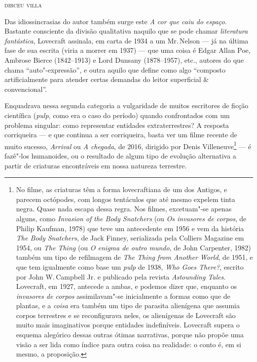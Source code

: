 \baselineskip


\begin{flushright}
\textsc{dirceu villa}
\end{flushright}

\noindent{}Das idiossincrasias do autor também surge este \textit{A cor que caiu do espaço}. Bastante consciente da divisão qualitativa naquilo que se pode chamar \textit{literatura fantástica}, Lovecraft assinala, em carta de 1934 a um Mr.\,Nelson --- já na última fase de sua escrita (viria a morrer em 1937) --- que uma coisa é Edgar Allan Poe, Ambrose Bierce (1842--1913) e Lord Dunsany (1878--1957), etc., autores do que chama ``auto"-expressão'', e outra aquilo que define como algo ``composto artificialmente para atender certas demandas do leitor superficial \& convencional''.

Enquadrava nessa segunda categoria a vulgaridade de muitos escritores de ficção
científica (\textit{pulp}, como era o caso do período) quando confrontados
com um problema singular: como representar entidades extraterrestres? A
resposta corriqueira --- e que continua a ser corriqueira, basta ver um
filme recente de muito sucesso, \textit{Arrival} ou \textit{A chegada}, de 2016,
dirigido por Denis Villeneuve\footnote{No filme, as criaturas têm a forma lovecraftiana de um dos Antigos, e parecem octópodes, com longos tentáculos que até mesmo expelem tinta negra. Quase nada escapa dessa regra. Nos filmes, excetuam"-se apenas alguns, como \textit{Invasion of the Body Snatchers} (ou \textit{Os invasores de corpos}, de Philip Kaufman, 1978) que teve um antecedente em 1956 e vem da história \textit{The Body Snatchers}, de Jack Finney, serializada pela Colliers Magazine em 1954, ou \textit{The Thing} (ou \textit{O enigma de outro mundo}, de John Carpenter, 1982) também um tipo de refilmagem de \textit{The Thing from Another World}, de 1951, e que tem igualmente como base um \textit{pulp} de 1938, \textit{Who Goes There?}, escrito por John W.\,Campbell Jr. e publicado pela revista \textit{Astounding Tales}. Lovecraft, em 1927, antecede a ambas, e podemos dizer que, enquanto os \textit{invasores de corpos} assimilavam"-se inicialmente a formas como que de plantas, e a \textit{coisa} era também um tipo de parasita alienígena que assumia corpos terrestres e se reconfigurava neles, os alienígenas de Lovecraft são muito mais imaginativos porque entidades indefiníveis. Lovecraft supera o esquema alegórico dessas outras ótimas narrativas, porque não propõe uma visão a ser lida como índice para outra coisa na realidade: o conto é, em si mesmo, a proposição.} --- é fazê"-los
humanoides, ou o resultado de algum tipo de evolução alternativa a
partir de criaturas encontráveis em nossa natureza terrestre.

